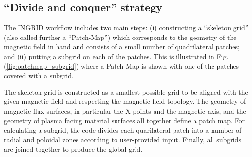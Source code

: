 \subsection{\label{sec:level2} ``Divide and conquer'' strategy}

The INGRID workflow includes two main steps: (i) constructing a
``skeleton grid'' (also called further a ``Patch-Map'') which
corresponds to the geometry of the magnetic field in hand and consists
of a small number of quadrilateral patches; and (ii) putting a subgrid
on each of the patches. This is illustrated in
Fig. (\ref{fig:patchmap_subgrid}) where a Patch-Map is shown with one
of the patches covered with a subgrid.

The skeleton grid is constructed as a smallest possible grid to be
aligned with the given magnetic field and respecting the magnetic
field topology. The geometry of magnetic flux surfaces, in particular
the X-points and the magnetic axis, and the geometry of plasma facing
material surfaces all together define a patch map. For calculating a
subgrid, the code divides each quarilateral patch into a number of
radial and poloidal zones according to user-provided input. Finally,
all subgrids are joined together to produce the global grid.
